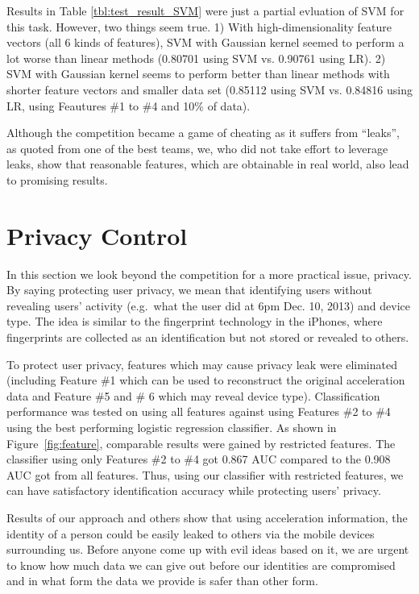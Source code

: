 \documentclass{article} %
\begin{document}
Results in Table \ref{tbl:test_result_SVM} were just a partial evluation of SVM for this task. However, two things seem true. 1) With high-dimensionality feature vectors (all 6 kinds of features), SVM with Gaussian kernel seemed to perform a lot worse than linear methods (0.80701 using SVM vs. 0.90761 using LR). 2) SVM with Gaussian kernel seems to perform better than linear methods with shorter feature vectors and smaller data set (0.85112 using SVM vs. 0.84816 using LR, using Feautures \#1 to \#4 and 10\% of data).

Although the competition became a game of cheating as it suffers from ``leaks'', as quoted from one of the best teams, we, who did not take effort to leverage leaks, show that reasonable features, which are obtainable in real world, also lead to promising results.


\section{Privacy Control}
In this section we look beyond the competition for a more practical issue, privacy. By saying protecting user privacy, we mean that identifying users without revealing users' activity (e.g.\ what the user did at 6pm Dec. 10, 2013) and device type. The idea is similar to the fingerprint technology in the iPhones, where fingerprints are collected as an identification but not stored or revealed to others.

To protect user privacy, features which may cause privacy leak were eliminated (including Feature \#1 which can be used to reconstruct the original acceleration data and Feature \#5 and \# 6 which may reveal device type). Classification performance was tested on using all features against using Features \#2 to \#4 using the best performing logistic regression classifier. As shown in Figure~\ref{fig:feature}, comparable results were gained by restricted features. The classifier using only Features \#2 to \#4 got 0.867 AUC compared to the 0.908 AUC got from all features. Thus, using our classifier with restricted features, we can have satisfactory identification accuracy while protecting users' privacy.



Results of our approach and others show that using acceleration information, the identity of a person could be easily leaked to others via the mobile devices surrounding us. Before anyone come up with evil ideas based on it, we are urgent to know how much data we can give out before our identities are compromised and in what form the data we provide is safer than other form.
\end{document}
